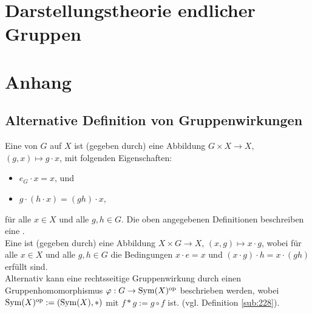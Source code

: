 \section{Darstellungstheorie endlicher Gruppen} %
\label{sec:4}



\cleardoubleoddemptypage
\appendix
\section{Anhang} %
\label{sec:anhang}
\subsection{Alternative Definition von Gruppenwirkungen} %
\label{sub:anh_1}
Eine  von $G$ auf $X$ ist (gegeben durch) eine Abbildung $G\times X \to X$, $(g,x)\mapsto g\cdot x$, mit folgenden Eigenschaften:
\begin{itemize}
	\item $e_G \cdot x= x$, und
	\item $g\cdot(h\cdot x)=(gh)\cdot x$,
\end{itemize}
für alle $x \in X$ und alle $g,h\in G$.
Die oben angegebenen Definitionen beschreiben eine .\\
Eine  ist (gegeben durch) eine Abbildung $X\times G \to X$, $(x,g)\mapsto x\cdot g$, 
wobei für alle $x\in X$ und alle $g,h\in G$ die Bedingungen $x\cdot e=x$ und $(x\cdot g) \cdot h =x \cdot (gh)$ erfüllt sind.\\
Alternativ kann eine rechtsseitige Gruppenwirkung durch einen Gruppenhomomorphismus $\varphi : G \to \operatorname{Sym}(X)^\mathrm{op}$ beschrieben werden, 
wobei $\operatorname{Sym}(X)^\mathrm{op}:=(\operatorname{Sym}(X),*)$ mit $f*g:=g\circ f$ ist. (vgl. Definition \ref{sub:228}).
\newpage
{}
\setcounter{page}{1}

\printindex
\listoffigures

